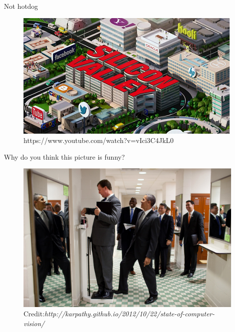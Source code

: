 
\begin{frame}{Not hotdog}
	\begin{figure}
		\includegraphics[width=.87\textwidth, center]{figures/silicon_valley_title}
		\caption*{{\tiny https://www.youtube.com/watch?v=vIci3C4JkL0}}
	\end{figure}
	 
\end{frame}

\begin{frame}{\hypertarget{obama_funny_pic}{Why do you think this picture is funny?}}
	\begin{figure}
		\includegraphics[width=.87\textwidth, center]{figures/obama-funny}
		\caption*{{\tiny Credit:{\em http://karpathy.github.io/2012/10/22/state-of-computer-vision/}}}
	\end{figure}
\end{frame}
